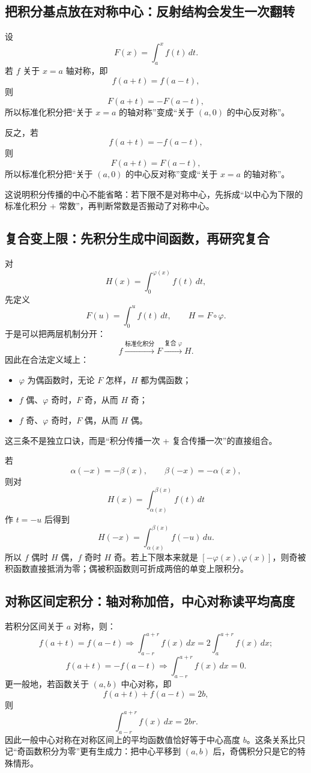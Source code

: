 \documentclass[11pt,a4paper]{ctexart}
\begin{document}
\subsection{把积分基点放在对称中心：反射结构会发生一次翻转}
设
\[
F(x)=\int_a^x f(t)\,dt.
\]
若 $f$ 关于 $x=a$ 轴对称，即
\[
f(a+t)=f(a-t),
\]
则
\[
\boxed{F(a+t)=-F(a-t)},
\]
所以标准化积分把“关于 $x=a$ 的轴对称”变成“关于 $(a,0)$ 的中心反对称”。

反之，若
\[
f(a+t)=-f(a-t),
\]
则
\[
\boxed{F(a+t)=F(a-t)},
\]
所以标准化积分把“关于 $(a,0)$ 的中心反对称”变成“关于 $x=a$ 的轴对称”。

这说明积分传播的中心不能省略：若下限不是对称中心，先拆成“以中心为下限的标准化积分 + 常数”，再判断常数是否搬动了对称中心。

\subsection{复合变上限：先积分生成中间函数，再研究复合}
对
\[
H(x)=\int_0^{\varphi(x)}f(t)\,dt,
\]
先定义
\[
F(u)=\int_0^u f(t)\,dt,
\qquad H=F\circ\varphi.
\]
于是可以把两层机制分开：
\[
\boxed{f\xrightarrow{\text{标准化积分}}F\xrightarrow{\text{复合 }\varphi}H}.
\]
因此在合法定义域上：
\begin{itemize}
\item $\varphi$ 为偶函数时，无论 $F$ 怎样，$H$ 都为偶函数；
\item $f$ 偶、$\varphi$ 奇时，$F$ 奇，从而 $H$ 奇；
\item $f$ 奇、$\varphi$ 奇时，$F$ 偶，从而 $H$ 偶。
\end{itemize}
这三条不是独立口诀，而是“积分传播一次 + 复合传播一次”的直接组合。

若
\[
\alpha(-x)=-\beta(x),\qquad \beta(-x)=-\alpha(x),
\]
则对
\[
H(x)=\int_{\alpha(x)}^{\beta(x)}f(t)\,dt
\]
作 $t=-u$ 后得到
\[
H(-x)=\int_{\alpha(x)}^{\beta(x)}f(-u)\,du.
\]
所以 $f$ 偶时 $H$ 偶，$f$ 奇时 $H$ 奇。若上下限本来就是 $[-\varphi(x),\varphi(x)]$，则奇被积函数直接抵消为零；偶被积函数则可折成两倍的单变上限积分。

\subsection{对称区间定积分：轴对称加倍，中心对称读平均高度}
若积分区间关于 $a$ 对称，则：
\[
f(a+t)=f(a-t)
\Longrightarrow
\boxed{\int_{a-r}^{a+r}f(x)\,dx=2\int_a^{a+r}f(x)\,dx};
\]
\[
f(a+t)=-f(a-t)
\Longrightarrow
\boxed{\int_{a-r}^{a+r}f(x)\,dx=0}.
\]
更一般地，若函数关于 $(a,b)$ 中心对称，即
\[
f(a+t)+f(a-t)=2b,
\]
则
\[
\boxed{\int_{a-r}^{a+r}f(x)\,dx=2br}.
\]
因此一般中心对称在对称区间上的平均函数值恰好等于中心高度 $b$。这条关系比只记“奇函数积分为零”更有生成力：把中心平移到 $(a,b)$ 后，奇偶积分只是它的特殊情形。
\end{document}
